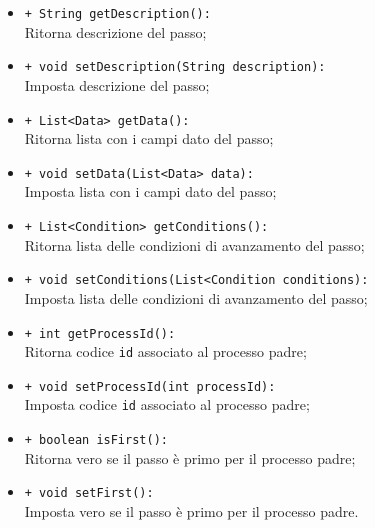 \begin{flushleft}
\begin{itemize}
\begin{sloppypar}
\begin{itemize}
\item \texttt{+ String getDescription():}\\ Ritorna descrizione del passo;
\item \texttt{+ void setDescription(String description):}\\ Imposta descrizione del passo;
\item \texttt{+ List<Data> getData():}\\ Ritorna lista con i campi dato del passo;
\item \texttt{+ void setData(List<Data> data):}\\ Imposta lista con i campi dato del passo;
\item \texttt{+ List<Condition> getConditions():}\\ Ritorna lista delle condizioni di avanzamento del passo;
\item \texttt{+ void setConditions(List<Condition conditions):}\\ Imposta lista delle condizioni di avanzamento del passo;
\item \texttt{+ int getProcessId():}\\ Ritorna codice \texttt{id} associato al processo padre;
\item \texttt{+ void setProcessId(int processId):}\\ Imposta codice \texttt{id} associato al processo padre;
\item \texttt{+ boolean isFirst():}\\ Ritorna vero se il passo è primo per il processo padre;
\item \texttt{+ void setFirst():}\\ Imposta vero se il passo è primo per il processo padre. 
\end{itemize}
\end{sloppypar}
\end{itemize}
\end{flushleft}

